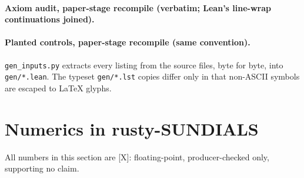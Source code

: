 \documentclass[11pt]{article}
\theoremstyle{remark}
\newcommand{\tier}[1]{\textsf{[#1]}}
\begin{document}







\paragraph{Axiom audit, paper-stage recompile (verbatim; Lean's line-wrap continuations joined).}

\paragraph{Planted controls, paper-stage recompile (same convention).}

\texttt{gen\_inputs.py} extracts every listing from the source files, byte for byte, into \texttt{gen/*.lean}. The
typeset \texttt{gen/*.lst} copies differ only in that non-ASCII symbols are escaped to LaTeX glyphs.

\section{Numerics in rusty-SUNDIALS}\label{sec:numerics}
All numbers in this section are \tier{X}: floating-point, producer-checked only, supporting no claim.
\end{document}
